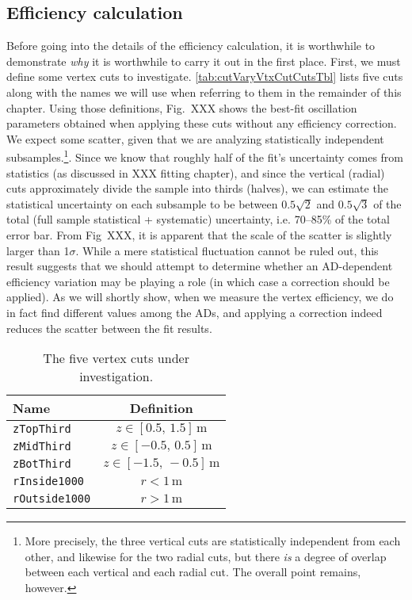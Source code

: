 \documentclass[../thesis.tex]{subfiles}
\begin{document}
\subsection{Efficiency calculation}
\label{sec:cutVaryVtxCutEffCalc}

Before going into the details of the efficiency calculation, it is worthwhile to demonstrate \emph{why} it is worthwhile to carry it out in the first place. First, we must define some vertex cuts to investigate. \autoref{tab:cutVaryVtxCutCutsTbl} lists five cuts along with the names we will use when referring to them in the remainder of this chapter. Using those definitions, Fig.~XXX shows the best-fit oscillation parameters obtained when applying these cuts without any efficiency correction. We expect some scatter, given that we are analyzing statistically independent subsamples.\footnote{More precisely, the three vertical cuts are statistically independent from each other, and likewise for the two radial cuts, but there \emph{is} a degree of overlap between each vertical and each radial cut. The overall point remains, however.}. Since we know that roughly half of the fit's uncertainty comes from statistics (as discussed in XXX fitting chapter), and since the vertical (radial) cuts approximately divide the sample into thirds (halves), we can estimate the statistical uncertainty on each subsample to be between $0.5\sqrt{2}$ and $0.5\sqrt{3}$ of the total (full sample statistical + systematic) uncertainty, i.e. 70--85\% of the total error bar. From Fig~XXX, it is apparent that the scale of the scatter is slightly larger than 1$\sigma$. While a mere statistical fluctuation cannot be ruled out, this result suggests that we should attempt to determine whether an AD-dependent efficiency variation may be playing a role (in which case a correction should be applied). As we will shortly show, when we measure the vertex efficiency, we do in fact find different values among the ADs, and applying a correction indeed reduces the scatter between the fit results.

\begin{comment}
(XXX note we haven't actually plotted the results of applying no efficiency correction. The scatter might be well above 1sigma in which case we need to reword the above.)
\end{comment}


\begin{table}[h]
  \begin{tabular}{lc}
    \toprule
    Name & Definition \\
    \midrule
    \texttt{zTopThird} & $z \in [0.5,\, 1.5]\,\mathrm{m}$ \\
    \texttt{zMidThird} & $z \in [-0.5,\, 0.5]\,\mathrm{m}$ \\
    \texttt{zBotThird} & $z \in [-1.5,\, -0.5]\,\mathrm{m}$ \\
    \texttt{rInside1000} & $r < 1\,\mathrm{m}$ \\
    \texttt{rOutside1000} & $r > 1\,\mathrm{m}$ \\
    \bottomrule
  \end{tabular}
  \caption{The five vertex cuts under investigation.}
  \label{tab:cutVaryVtxCutCutsTbl}
\end{table}
\end{document}
